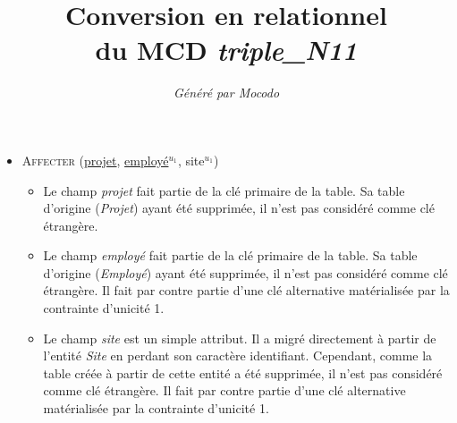 \documentclass[a4paper]{article}
\title{Conversion en relationnel\\du MCD \emph{triple_N11}}
\author{\emph{Généré par Mocodo}}
\newcommand{\relat}[1]{\textsc{#1}}
\newcommand{\attr}[1]{#1}
\newcommand{\prim}[1]{\uline{#1}}
\begin{document}
\maketitle

\begin{itemize}
  \item \relat{Affecter} (\prim{projet}, \prim{employé}$^{u_1}$, \attr{site}$^{u_1}$)
  \begin{itemize}
    \item Le champ \emph{projet} fait partie de la clé primaire de la table. Sa table d'origine (\emph{Projet}) ayant été supprimée, il n'est pas considéré comme clé étrangère.
    \item Le champ \emph{employé} fait partie de la clé primaire de la table. Sa table d'origine (\emph{Employé}) ayant été supprimée, il n'est pas considéré comme clé étrangère. Il fait par contre partie d'une clé alternative matérialisée par la contrainte d'unicité 1.
    \item Le champ \emph{site} est un simple attribut. Il a migré directement à partir de l'entité \emph{Site} en perdant son caractère identifiant. Cependant, comme la table créée à partir de cette entité a été supprimée, il n'est pas considéré comme clé étrangère. Il fait par contre partie d'une clé alternative matérialisée par la contrainte d'unicité 1.
  \end{itemize}

\end{itemize}
\end{document}
